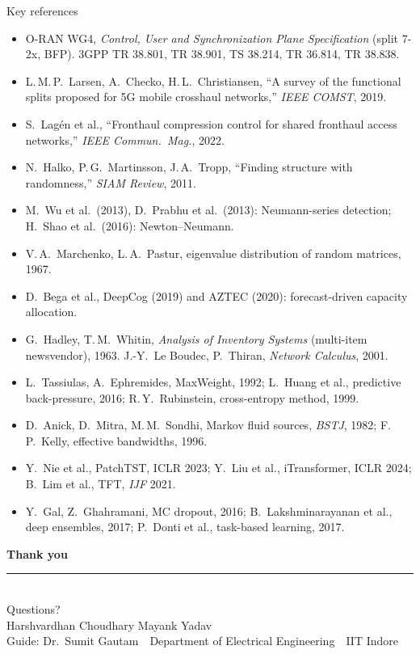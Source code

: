 \documentclass[aspectratio=169,10pt,xcolor={table,dvipsnames}]{beamer}
\begin{document}
\begin{frame}{Key references}
\scriptsize
\begin{itemize}
  \item O-RAN WG4, \emph{Control, User and Synchronization Plane Specification} (split 7-2x, BFP). \quad 3GPP TR 38.801, TR 38.901, TS 38.214, TR 36.814, TR 38.838.
  \item L.\,M.\,P.\ Larsen, A.\ Checko, H.\,L.\ Christiansen, ``A survey of the functional splits proposed for 5G mobile crosshaul networks,'' \emph{IEEE COMST}, 2019.
  \item S.\ Lag\'en et al., ``Fronthaul compression control for shared fronthaul access networks,'' \emph{IEEE Commun.\ Mag.}, 2022.
  \item N.\ Halko, P.\,G.\ Martinsson, J.\,A.\ Tropp, ``Finding structure with randomness,'' \emph{SIAM Review}, 2011.
  \item M.\ Wu et al.\ (2013), D.\ Prabhu et al.\ (2013): Neumann-series detection; H.\ Shao et al.\ (2016): Newton--Neumann.
  \item V.\,A.\ Marchenko, L.\,A.\ Pastur, eigenvalue distribution of random matrices, 1967.
  \item D.\ Bega et al., DeepCog (2019) and AZTEC (2020): forecast-driven capacity allocation.
  \item G.\ Hadley, T.\,M.\ Whitin, \emph{Analysis of Inventory Systems} (multi-item newsvendor), 1963. \quad J.-Y.\ Le Boudec, P.\ Thiran, \emph{Network Calculus}, 2001.
  \item L.\ Tassiulas, A.\ Ephremides, MaxWeight, 1992; L.\ Huang et al., predictive back-pressure, 2016; R.\,Y.\ Rubinstein, cross-entropy method, 1999.
  \item D.\ Anick, D.\ Mitra, M.\,M.\ Sondhi, Markov fluid sources, \emph{BSTJ}, 1982; F.\,P.\ Kelly, effective bandwidths, 1996.
  \item Y.\ Nie et al., PatchTST, ICLR 2023; Y.\ Liu et al., iTransformer, ICLR 2024; B.\ Lim et al., TFT, \emph{IJF} 2021.
  \item Y.\ Gal, Z.\ Ghahramani, MC dropout, 2016; B.\ Lakshminarayanan et al., deep ensembles, 2017; P.\ Donti et al., task-based learning, 2017.
\end{itemize}
\end{frame}

{
\begin{frame}
\centering
\vspace{1.2cm}
{\color{white}\fontsize{34}{40}\selectfont\bfseries Thank you}\\[0.4cm]
{\color{gold}\rule{3cm}{1.5pt}}\\[0.5cm]
{\color{white}\Large Questions?}\\[1.3cm]
{\color{white}\small Harshvardhan Choudhary \quad\textbullet\quad Mayank Yadav}\\[3pt]
{\color{white!80!iitblue}\footnotesize Guide: Dr.~Sumit Gautam \,\textbullet\, Department of Electrical Engineering \,\textbullet\, IIT Indore}
\end{frame}
}
\end{document}
